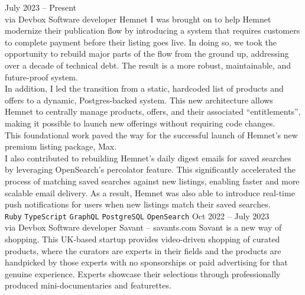 \documentclass[9pt]{template} %
\begin{document}
\begin{entrylist}
  \entry
    {July 2023 -- Present\\\footnotesize{via Devbox}}
    {Software developer}
    {Hemnet}
    {
      I was brought on to help Hemnet modernize their publication flow by introducing
      a system that requires customers to complete payment before their listing goes
      live. In doing so, we took the opportunity to rebuild major parts of the flow
      from the ground up, addressing over a decade of technical debt. The result is a
      more robust, maintainable, and future-proof system.\\

      In addition, I led the transition from a static, hardcoded list of products and
      offers to a dynamic, Postgres-backed system. This new architecture allows Hemnet
      to centrally manage products, offers, and their associated “entitlements”, making
      it possible to launch new offerings without requiring code changes.\\

      This foundational work paved the way for the successful launch of Hemnet's new
      premium listing package, Max.\\

      I also contributed to rebuilding Hemnet's daily digest emails for saved searches
      by leveraging OpenSearch's percolator feature. This significantly accelerated the
      process of matching saved searches against new listings, enabling faster and more
      scalable email delivery. As a result, Hemnet was also able to introduce real-time
      push notifications for users when new listings match their saved searches.\\
      \texttt{Ruby}\slashsep
      \texttt{TypeScript}\slashsep
      \texttt{GraphQL}\slashsep
      \texttt{PostgreSQL}\slashsep
      \texttt{OpenSearch}
    }
  \entry
    {Oct 2022 -- July 2023\\\footnotesize{via Devbox}}
    {Software developer}
    {Savant -- savants.com}
    {
      Savant is a new way of shopping. This UK-based startup provides
      video-driven shopping of curated products, where the curators are experts
      in their fields and the products are handpicked by those experts with no
      sponsorships or paid advertising for that genuine experience. Experts
      showcase their selections through professionally produced
      mini-documentaries and featurettes.\\

}
\end{entrylist}
\end{document}
